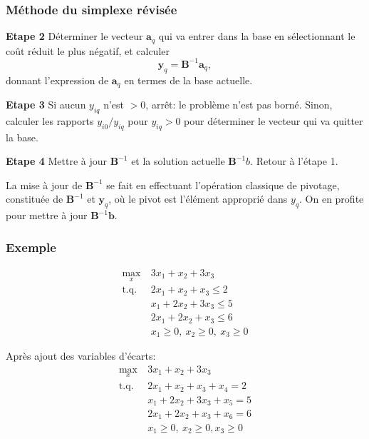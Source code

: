 \documentclass[usepdftitle=false]{beamer}
\def\ba{\boldsymbol{a}}
\def\bb{\boldsymbol{b}}
\def\by{\boldsymbol{y}}
\def\bB{\boldsymbol{B}}
\begin{document}
\begin{frame}
\frametitle{Méthode du simplexe révisée}

{\bf Etape 2} Déterminer le vecteur $\ba_q$ qui va entrer dans la base en sélectionnant le coût réduit le plus négatif, et calculer
\[
 \by_q = \bB^{-1}\ba_q,
\]
donnant l'expression de $\ba_q$ en termes de la base actuelle.

\mbox{}

{\bf Etape 3} 
Si aucun $y_{iq}$ n'est $> 0$, arrêt: le problème n'est pas borné. Sinon, calculer les rapports $y_{i0}/y_{iq}$ pour $y_{iq} > 0$ pour déterminer le vecteur qui va quitter la base.

\mbox{}

{\bf Etape 4}
Mettre à jour $\bB^{-1}$ et la solution actuelle $\bB^{-1}b$. Retour à l'étape 1.

La mise à jour de $\bB^{-1}$ se fait en effectuant l'opération classique de pivotage, constituée de $\bB^{-1}$ et $\by_q$, où le pivot est l'élément approprié dans $y_q$. On en profite pour mettre à jour $\bB^{-1}\bb$.
\end{frame}

\begin{frame}
\frametitle{Exemple}

\begin{align*}
\max_x\ & 3x_1 + x_2 + 3x_3 \\
\mbox{t.q. } & 2x_1 + x_2 + x_3 \leq 2 \\
& x_1 + 2x_2 + 3x_3 \leq 5 \\
& 2x_1 +2x_2 + x_3 \leq 6 \\
& x_1 \geq 0,\ x_2 \geq 0,\ x_3 \geq 0 
\end{align*}

\mbox{}

Après ajout des variables d'écarts:
\begin{align*}
\max_x\ & 3x_1 + x_2 + 3x_3 \\
\mbox{t.q. } & 2x_1 + x_2 + x_3 + x_4 = 2 \\
& x_1 + 2x_2 + 3x_3 + x_5 = 5 \\
& 2x_1 +2x_2 + x_3 + x_6 = 6 \\
& x_1 \geq 0,\ x_2 \geq 0, x_3 \geq 0
\end{align*}

\end{frame}
\end{document}
